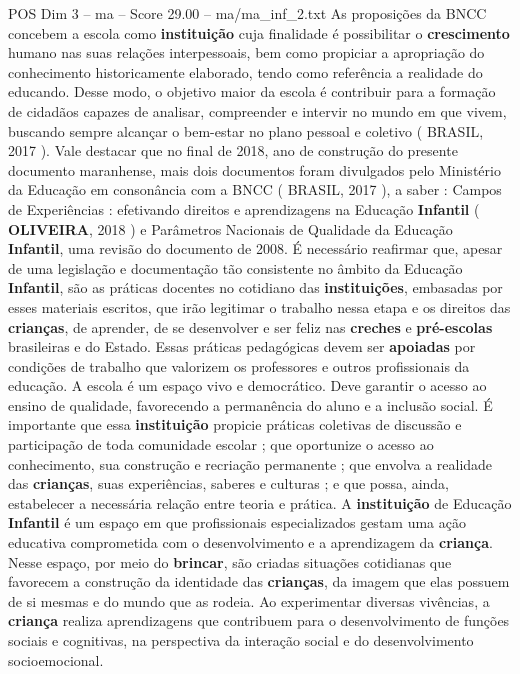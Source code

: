 \begin{textsample}{POS Dim 3 – ma – Score 29.00 – ma/ma\_inf\_2.txt}
As proposições da BNCC concebem a escola como \textbf{instituição} cuja finalidade é possibilitar o \textbf{crescimento} humano nas suas relações interpessoais, bem como propiciar a apropriação do conhecimento historicamente elaborado, tendo como referência a realidade do educando.
Desse modo, o objetivo maior da escola é contribuir para a formação de cidadãos capazes de analisar, compreender e intervir no mundo em que vivem, buscando sempre alcançar o bem-estar no plano pessoal e coletivo ( BRASIL, 2017 ).
Vale destacar que no final de 2018, ano de construção do presente documento maranhense, mais dois documentos foram divulgados pelo Ministério da Educação em consonância com a BNCC ( BRASIL, 2017 ), a saber : Campos de Experiências : efetivando direitos e aprendizagens na Educação \textbf{Infantil} ( \textbf{OLIVEIRA}, 2018 ) e Parâmetros Nacionais de Qualidade da Educação \textbf{Infantil}, uma revisão do documento de 2008.
É necessário reafirmar que, apesar de uma legislação e documentação tão consistente no âmbito da Educação \textbf{Infantil}, são as práticas docentes no cotidiano das \textbf{instituições}, embasadas por esses materiais escritos, que irão legitimar o trabalho nessa etapa e os direitos das \textbf{crianças}, de aprender, de se desenvolver e ser feliz nas \textbf{creches} e \textbf{pré-escolas} brasileiras e do Estado.
Essas práticas pedagógicas devem ser \textbf{apoiadas} por condições de trabalho que valorizem os professores e outros profissionais da educação.
A escola é um espaço vivo e democrático.
Deve garantir o acesso ao ensino de qualidade, favorecendo a permanência do aluno e a inclusão social.
É importante que essa \textbf{instituição} propicie práticas coletivas de discussão e participação de toda comunidade escolar ; que oportunize o acesso ao conhecimento, sua construção e recriação permanente ; que envolva a realidade das \textbf{crianças}, suas experiências, saberes e culturas ; e que possa, ainda, estabelecer a necessária relação entre teoria e prática.
A \textbf{instituição} de Educação \textbf{Infantil} é um espaço em que profissionais especializados gestam uma ação educativa comprometida com o desenvolvimento e a aprendizagem da \textbf{criança}.
Nesse espaço, por meio do \textbf{brincar}, são criadas situações cotidianas que favorecem a construção da identidade das \textbf{crianças}, da imagem que elas possuem de si mesmas e do mundo que as rodeia.
Ao experimentar diversas vivências, a \textbf{criança} realiza aprendizagens que contribuem para o desenvolvimento de funções sociais e cognitivas, na perspectiva da interação social e do desenvolvimento socioemocional.

\end{textsample}

